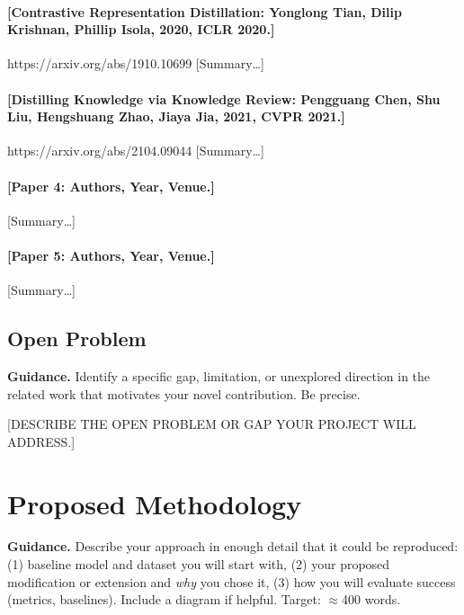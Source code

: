 \documentclass[11pt, letterpaper]{article}
\begin{document}
\paragraph{[Contrastive Representation Distillation: Yonglong Tian, Dilip Krishnan, Phillip Isola, 2020, ICLR 2020.]}
https://arxiv.org/abs/1910.10699
[Summary\ldots]

\paragraph{[Distilling Knowledge via Knowledge Review: Pengguang Chen, Shu Liu, Hengshuang Zhao, Jiaya Jia, 2021, CVPR 2021.]}
https://arxiv.org/abs/2104.09044
[Summary\ldots]

\paragraph{[Paper 4: Authors, Year, Venue.]}
[Summary\ldots]

\paragraph{[Paper 5: Authors, Year, Venue.]}
[Summary\ldots]

\subsection{Open Problem}

\begin{guidancebox}
\textbf{Guidance.} Identify a specific gap, limitation, or unexplored direction
in the related work that motivates your novel contribution. Be precise.
\end{guidancebox}

[DESCRIBE THE OPEN PROBLEM OR GAP YOUR PROJECT WILL ADDRESS.]

\section{Proposed Methodology}

\begin{guidancebox}
\textbf{Guidance.}
Describe your approach in enough detail that it could be reproduced:
(1) baseline model and dataset you will start with,
(2) your proposed modification or extension and \emph{why} you chose it,
(3) how you will evaluate success (metrics, baselines).
Include a diagram if helpful. Target: $\approx$400 words.
\end{guidancebox}
\end{document}
